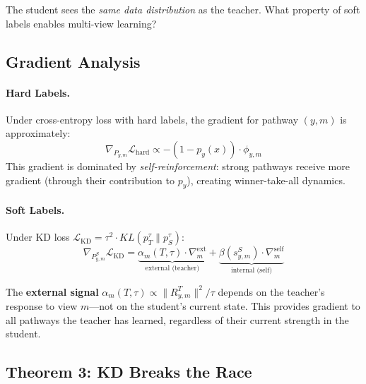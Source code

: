 \documentclass{article}
\newcommand{\cL}{\mathcal{L}}
\begin{document}
The student sees the \emph{same data distribution} as the teacher. What property of soft labels enables multi-view learning?

\subsection{Gradient Analysis}

\paragraph{Hard Labels.} Under cross-entropy loss with hard labels, the gradient for pathway $(y,m)$ is approximately:
\begin{equation}
    \nabla_{P_{y,m}} \cL_{\text{hard}} \propto -(1 - p_y(x)) \cdot \phi_{y,m}
\end{equation}
This gradient is dominated by \emph{self-reinforcement}: strong pathways receive more gradient (through their contribution to $p_y$), creating winner-take-all dynamics.

\paragraph{Soft Labels.} Under KD loss $\cL_{\text{KD}} = \tau^2 \cdot KL(p_T^\tau \| p_S^\tau)$:
\begin{equation}
    \nabla_{P_{y,m}^S} \cL_{\text{KD}} = \underbrace{\alpha_m(T, \tau) \cdot \nabla_m^{\text{ext}}}_{\text{external (teacher)}} + \underbrace{\beta(s_{y,m}^S) \cdot \nabla_m^{\text{self}}}_{\text{internal (self)}}
\end{equation}

The \textbf{external signal} $\alpha_m(T, \tau) \propto \|R_{y,m}^T\|^2 / \tau$ depends on the teacher's response to view $m$---not on the student's current state. This provides gradient to all pathways the teacher has learned, regardless of their current strength in the student.

\subsection{Theorem 3: KD Breaks the Race}
\end{document}
